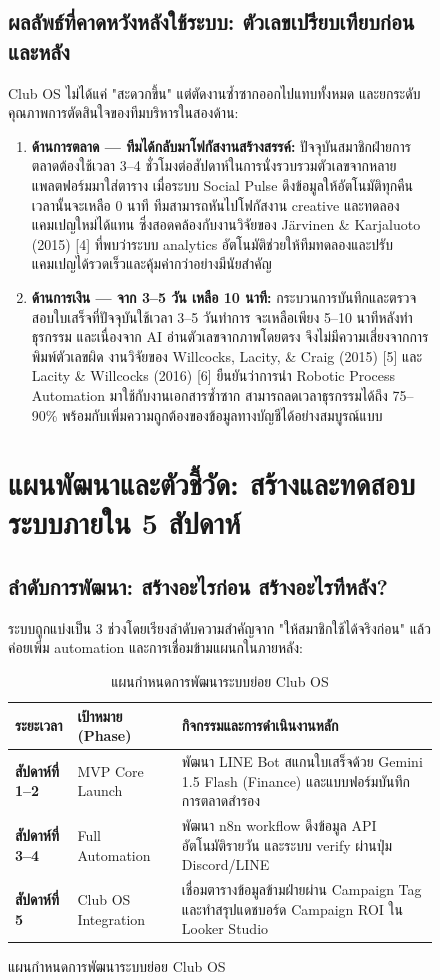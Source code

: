 \documentclass[10pt,a4paper]{article}
\begin{document}
\begin{figure}[h!]
\subsection{ผลลัพธ์ที่คาดหวังหลังใช้ระบบ: ตัวเลขเปรียบเทียบก่อนและหลัง}
Club OS ไม่ได้แค่ "สะดวกขึ้น" แต่ตัดงานซ้ำซากออกไปแทบทั้งหมด และยกระดับคุณภาพการตัดสินใจของทีมบริหารในสองด้าน:
\begin{enumerate}
  \item \textbf{ด้านการตลาด --- ทีมได้กลับมาโฟกัสงานสร้างสรรค์:} ปัจจุบันสมาชิกฝ่ายการตลาดต้องใช้เวลา 3--4 ชั่วโมงต่อสัปดาห์ในการนั่งรวบรวมตัวเลขจากหลายแพลตฟอร์มมาใส่ตาราง เมื่อระบบ Social Pulse ดึงข้อมูลให้อัตโนมัติทุกคืน เวลานั้นจะเหลือ 0 นาที ทีมสามารถหันไปโฟกัสงาน creative และทดลองแคมเปญใหม่ได้แทน ซึ่งสอดคล้องกับงานวิจัยของ Järvinen \& Karjaluoto (2015) [4] ที่พบว่าระบบ analytics อัตโนมัติช่วยให้ทีมทดลองและปรับแคมเปญได้รวดเร็วและคุ้มค่ากว่าอย่างมีนัยสำคัญ
  \item \textbf{ด้านการเงิน --- จาก 3--5 วัน เหลือ 10 นาที:} กระบวนการบันทึกและตรวจสอบใบเสร็จที่ปัจจุบันใช้เวลา 3--5 วันทำการ จะเหลือเพียง 5--10 นาทีหลังทำธุรกรรม และเนื่องจาก AI อ่านตัวเลขจากภาพโดยตรง จึงไม่มีความเสี่ยงจากการพิมพ์ตัวเลขผิด งานวิจัยของ Willcocks, Lacity, \& Craig (2015) [5] และ Lacity \& Willcocks (2016) [6] ยืนยันว่าการนำ Robotic Process Automation มาใช้กับงานเอกสารซ้ำซาก สามารถลดเวลาธุรกรรมได้ถึง 75--90\% พร้อมกับเพิ่มความถูกต้องของข้อมูลทางบัญชีได้อย่างสมบูรณ์แบบ
\end{enumerate}

\newpage

\section{แผนพัฒนาและตัวชี้วัด: สร้างและทดสอบระบบภายใน 5 สัปดาห์}
\subsection{ลำดับการพัฒนา: สร้างอะไรก่อน สร้างอะไรทีหลัง?}
ระบบถูกแบ่งเป็น 3 ช่วงโดยเรียงลำดับความสำคัญจาก "ให้สมาชิกใช้ได้จริงก่อน" แล้วค่อยเพิ่ม automation และการเชื่อมข้ามแผนกในภายหลัง:
\begin{table}[h!]
  \centering
  \caption{\chulafont แผนกำหนดการพัฒนาระบบย่อย Club OS}
  \begin{tabular}{llp{11.0cm}}
    \toprule
    \textbf{ระยะเวลา} & \textbf{เป้าหมาย (Phase)} & \textbf{กิจกรรมและการดำเนินงานหลัก} \\
    \midrule
    \textbf{สัปดาห์ที่ 1--2} & MVP Core Launch & พัฒนา LINE Bot สแกนใบเสร็จด้วย Gemini 1.5 Flash (Finance) และแบบฟอร์มบันทึกการตลาดสำรอง \\
    \textbf{สัปดาห์ที่ 3--4} & Full Automation & พัฒนา n8n workflow ดึงข้อมูล API อัตโนมัติรายวัน และระบบ verify ผ่านปุ่ม Discord/LINE \\
    \textbf{สัปดาห์ที่ 5} & Club OS Integration & เชื่อมตารางข้อมูลข้ามฝ่ายผ่าน Campaign Tag และทำสรุปแดชบอร์ด Campaign ROI ใน Looker Studio \\
    \bottomrule
  \end{tabular}
\end{table}


\end{figure}
\end{document}
